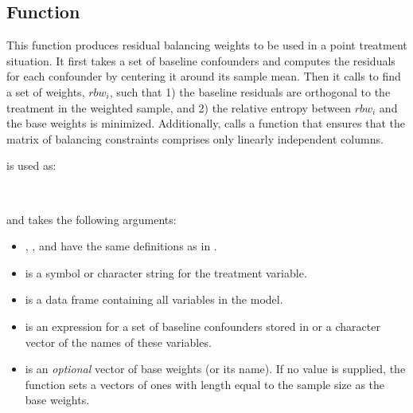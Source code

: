 \hypertarget{rbwPoint}{%
\subsection{\texorpdfstring{Function
}{Function }}\label{rbwPoint}}

This function produces residual balancing weights to be used in a point
treatment situation. It first takes a set of baseline confounders and
computes the residuals for each confounder by centering it around its
sample mean. Then it calls  to find a set of weights,
\(rbw_{i}\), such that 1) the baseline residuals are orthogonal to the
treatment in the weighted sample, and 2) the relative entropy between
\({rbw}_{i}\) and the base weights is minimized. Additionally,
 calls a function that ensures that the matrix of
balancing constraints comprises only linearly independent columns.

 is used as:

\\
\hspace*{0.333em}\hspace*{0.333em}\hspace*{0.333em}\hspace*{0.333em}\hspace*{0.333em}\hspace*{0.333em}\hspace*{0.333em}\hspace*{0.333em}\hspace*{0.333em}\hspace*{0.333em}\hspace*{0.333em}

and takes the following arguments:

\begin{itemize}
\tightlist
\item
  , , and  have the same
  definitions as in .
\item
   is a symbol or character string for the treatment
  variable.
\item
   is a data frame containing all variables in the model.
\item
   is an expression for a set of baseline confounders
  stored in  or a character vector of the names of these
  variables.
\item
   is an \emph{optional} vector of base weights (or
  its name). If no value is supplied, the function sets a vectors of
  ones with length equal to the sample size as the base weights.
\end{itemize}

